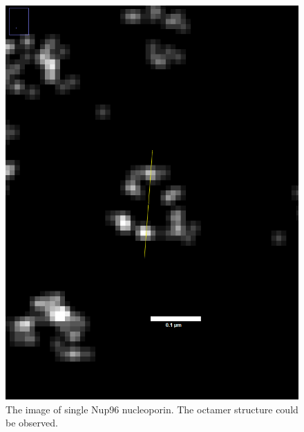 \documentclass[a4paper,english,12pt,bibliography=totoc]{scrreprt}
\begin{document}
\begin{figure}
    \centering
    \includegraphics[width=0.5\linewidth]{Images/STORM/typical pore.png}
    \caption{The image of single Nup96 nucleoporin. The octamer structure could be observed.}
    \label{fig:enter-label}
\end{figure}

\end{document}
